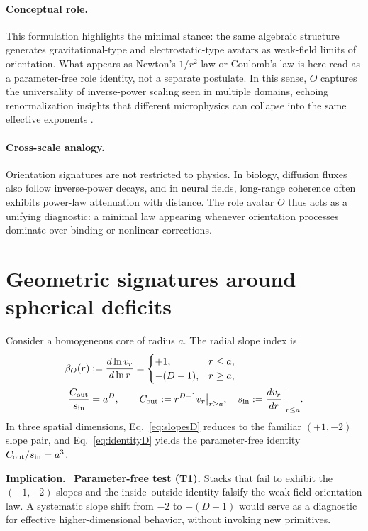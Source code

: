 \documentclass[12pt,a4paper,oneside]{scrreprt}
\newenvironment{implication}{\par\vspace{0.5em}\noindent\textbf{Implication.}\ }{\par\vspace{0.5em}}
\begin{document}
\paragraph{Conceptual role.} 
This formulation highlights the minimal stance: the same algebraic structure 
generates gravitational-type and electrostatic-type avatars as weak-field 
limits of orientation. 
What appears as Newton’s $1/r^2$ law or Coulomb’s law is here read as a 
parameter-free role identity, not a separate postulate. 
In this sense, $O$ captures the universality of inverse-power scaling 
seen in multiple domains, echoing renormalization insights that 
different microphysics can collapse into the same effective exponents 
\citep{Wilson1971RG}.

\paragraph{Cross-scale analogy.} 
Orientation signatures are not restricted to physics. 
In biology, diffusion fluxes also follow inverse-power decays, 
and in neural fields, long-range coherence often exhibits 
power-law attenuation with distance. 
The role avatar $O$ thus acts as a unifying diagnostic: 
a minimal law appearing whenever orientation processes dominate 
over binding or nonlinear corrections.

\section{Geometric signatures around spherical deficits}\label{sec:ur-signatures}

Consider a homogeneous core of radius $a$. 
The radial slope index is
\begin{align}
\beta_O(r) &:= \frac{d\ln v_r}{d\ln r} 
= \begin{cases}
+1, & r \le a, \\
-(D-1), & r \ge a,
\end{cases} \label{eq:slopesD} \\
\frac{C_{\rm out}}{s_{\rm in}} &= a^{D}, \qquad 
C_{\rm out} := r^{D-1} v_r \big|_{r \ge a}, \quad
s_{\rm in} := \frac{dv_r}{dr}\bigg|_{r \le a}.
\label{eq:identityD}
\end{align}
In three spatial dimensions, Eq.~\eqref{eq:slopesD} reduces to the familiar $(+1,-2)$ slope pair, 
and Eq.~\eqref{eq:identityD} yields the parameter-free identity $C_{\rm out}/s_{\rm in} = a^3$.

\begin{implication}
\textbf{Parameter-free test (T1).} 
Stacks that fail to exhibit the $(+1,-2)$ slopes and the inside--outside identity falsify 
the weak-field orientation law. 
A systematic slope shift from $-2$ to $-(D-1)$ would serve as a diagnostic for effective 
higher-dimensional behavior, without invoking new primitives.
\end{implication}
\end{document}
